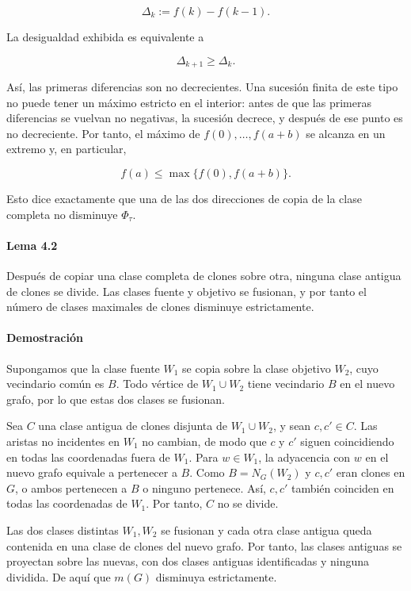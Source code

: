\documentclass[spanish,11pt,a4paper]{article}
\begin{document}
\[
\Delta_k:=f(k)-f(k-1).
\]

La desigualdad exhibida es equivalente a

\[
\Delta_{k+1}\ge\Delta_k.
\]

Así, las primeras diferencias son no decrecientes. Una sucesión finita
de este tipo no puede tener un máximo estricto en el interior: antes de
que las primeras diferencias se vuelvan no negativas, la sucesión
decrece, y después de ese punto es no decreciente. Por tanto, el máximo
de \(f(0),\ldots,f(a+b)\) se alcanza en un extremo y, en particular,

\[
f(a)\le\max\{f(0),f(a+b)\}.
\]

Esto dice exactamente que una de las dos direcciones de copia de la
clase completa no disminuye \(\Phi_\tau\).

\paragraph{Lema 4.2}\label{lema-4.2}

Después de copiar una clase completa de clones sobre otra, ninguna clase
antigua de clones se divide. Las clases fuente y objetivo se fusionan, y
por tanto el número de clases maximales de clones disminuye
estrictamente.

\paragraph{Demostración}\label{demostraciuxf3n-3}

Supongamos que la clase fuente \(W_1\) se copia sobre la clase objetivo
\(W_2\), cuyo vecindario común es \(B\). Todo vértice de \(W_1\cup W_2\)
tiene vecindario \(B\) en el nuevo grafo, por lo que estas dos clases se
fusionan.

Sea \(C\) una clase antigua de clones disjunta de \(W_1\cup W_2\), y
sean \(c,c'\in C\). Las aristas no incidentes en \(W_1\) no cambian, de
modo que \(c\) y \(c'\) siguen coincidiendo en todas las coordenadas
fuera de \(W_1\). Para \(w\in W_1\), la adyacencia con \(w\) en el nuevo
grafo equivale a pertenecer a \(B\). Como \(B=N_G(W_2)\) y \(c,c'\) eran
clones en \(G\), o ambos pertenecen a \(B\) o ninguno pertenece. Así,
\(c,c'\) también coinciden en todas las coordenadas de \(W_1\). Por
tanto, \(C\) no se divide.

Las dos clases distintas \(W_1,W_2\) se fusionan y cada otra clase
antigua queda contenida en una clase de clones del nuevo grafo. Por
tanto, las clases antiguas se proyectan sobre las nuevas, con dos clases
antiguas identificadas y ninguna dividida. De aquí que \(m(G)\)
disminuya estrictamente.
\end{document}
